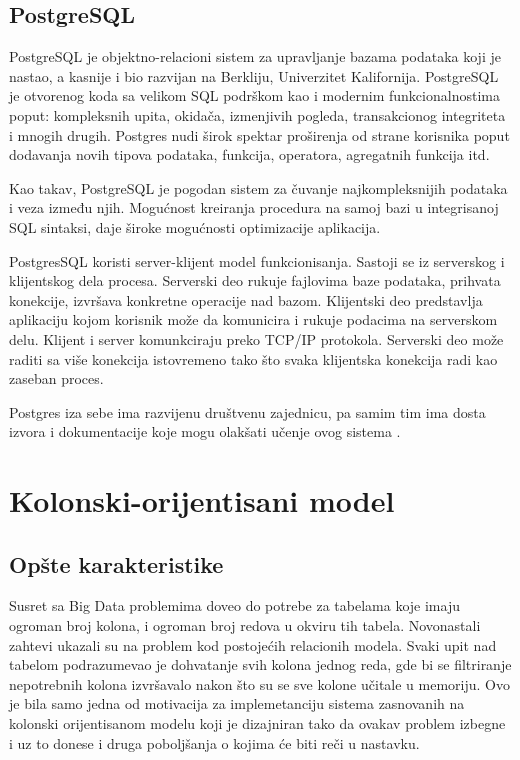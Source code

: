 \documentclass[12pt,oneside]{memoir}
\begin{document}
\subsection{PostgreSQL}


PostgreSQL je objektno-relacioni sistem za upravljanje bazama podataka koji je nastao, a kasnije i bio razvijan na Berkliju, Univerzitet Kalifornija. PostgreSQL je otvorenog koda sa velikom SQL podrškom kao i modernim funkcionalnostima poput: kompleksnih upita, okidača, izmenjivih pogleda, transakcionog integriteta i mnogih drugih. Postgres nudi širok spektar proširenja od strane korisnika poput dodavanja novih tipova podataka, funkcija, operatora, agregatnih funkcija itd. 

Kao takav, PostgreSQL je pogodan sistem za čuvanje najkompleksnijih podataka i veza između njih. Mogućnost kreiranja procedura na samoj bazi u integrisanoj SQL sintaksi, daje široke mogućnosti optimizacije aplikacija. 

PostgresSQL koristi server-klijent model funkcionisanja. Sastoji se iz serverskog i klijentskog dela procesa. Serverski deo rukuje fajlovima baze podataka, prihvata konekcije, izvršava konkretne operacije nad bazom. Klijentski deo predstavlja aplikaciju kojom korisnik može da komunicira i rukuje podacima na serverskom delu. Klijent i server komunkciraju preko TCP/IP protokola. Serverski deo može raditi sa više konekcija istovremeno tako što svaka klijentska konekcija radi kao zaseban proces.

Postgres iza sebe ima razvijenu društvenu zajednicu, pa samim tim ima dosta izvora i dokumentacije koje mogu olakšati učenje ovog sistema \cite{PostgreSQLUpAndRunning}. 

\section{Kolonski-orijentisani model}
\subsection{Opšte karakteristike}

Susret sa Big Data problemima doveo do potrebe za tabelama koje imaju ogroman broj kolona, i ogroman broj redova u okviru tih tabela. Novonastali zahtevi ukazali su na problem kod postojećih  relacionih modela. Svaki upit nad tabelom podrazumevao je dohvatanje svih kolona jednog reda, gde bi se filtriranje nepotrebnih kolona izvršavalo nakon što su se sve kolone učitale u memoriju. Ovo je bila samo jedna od motivacija za implemetanciju sistema zasnovanih na kolonski orijentisanom modelu koji je dizajniran tako da ovakav problem izbegne i uz to donese i druga poboljšanja o kojima će biti reči u nastavku.
\end{document}

